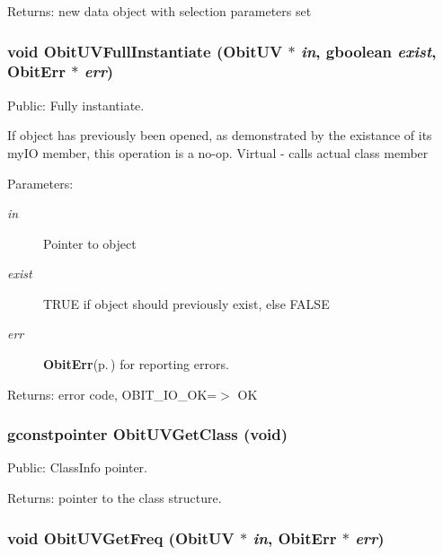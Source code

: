 \begin{Desc}
\item[Returns:]new data object with selection parameters set \end{Desc}
\subsubsection{\setlength{\rightskip}{0pt plus 5cm}void Obit\-UVFull\-Instantiate ({\bf Obit\-UV} $\ast$ {\em in}, gboolean {\em exist}, {\bf Obit\-Err} $\ast$ {\em err})}\label{ObitUV_8h_a27}


Public: Fully instantiate. 

If object has previously been opened, as demonstrated by the existance of its my\-IO member, this operation is a no-op. Virtual - calls actual class member \begin{Desc}
\item[Parameters:]
\begin{description}
\item[{\em in}]Pointer to object \item[{\em exist}]TRUE if object should previously exist, else FALSE \item[{\em err}]{\bf Obit\-Err}{\rm (p.\,\pageref{structObitErr})} for reporting errors. \end{description}
\end{Desc}
\begin{Desc}
\item[Returns:]error code, OBIT\_\-IO\_\-OK=$>$ OK \end{Desc}
\subsubsection{\setlength{\rightskip}{0pt plus 5cm}gconstpointer Obit\-UVGet\-Class (void)}\label{ObitUV_8h_a28}


Public: Class\-Info pointer. 

\begin{Desc}
\item[Returns:]pointer to the class structure. \end{Desc}
\subsubsection{\setlength{\rightskip}{0pt plus 5cm}void Obit\-UVGet\-Freq ({\bf Obit\-UV} $\ast$ {\em in}, {\bf Obit\-Err} $\ast$ {\em err})}\label{ObitUV_8h_a49}


